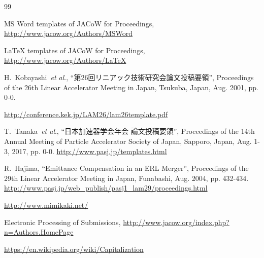 \documentclass{PASJ2026}
\begin{document}
%
\begin{thebibliography}{99}

MS Word templates of JACoW for Proceedings,
\url{http://www.jacow.org/Authors/MSWord}

LaTeX templates of JACoW for Proceedings,
\url{http://www.jacow.org/Authors/LaTeX}

H.~Kobayashi~\textit{et al}., ``第26回リニアック技術研究会論文投稿要領'', Proceedings of the 26th Linear Accelerator Meeting in Japan, Tsukuba, Japan, Aug. 2001, pp. 0-0.

\url{http://conference.kek.jp/LAM26/lam26template.pdf}

T.~Tanaka~\textit{et al}., ``日本加速器学会年会 論文投稿要領'', Proceedings of the 14th Annual Meeting of Particle Accelerator Society of Japan, Sapporo, Japan, Aug. 1-3, 2017, pp. 0-0. \url{http://www.pasj.jp/templates.html}

R.~Hajima, ``Emittance Compensation in an ERL Merger'', Proceedings of the 29th Linear Accelerator Meeting in Japan, Funabashi, Aug. 2004, pp. 432-434. \url{http://www.pasj.jp/web_publish/pasj1_lam29/proceedings.html}

\url{http://www.mimikaki.net/}

Electronic Processing of Submissions, \url{http://www.jacow.org/index.php?n=Authors.HomePage}

\url{https://en.wikipedia.org/wiki/Capitalization}


\end{thebibliography}
\end{document}
